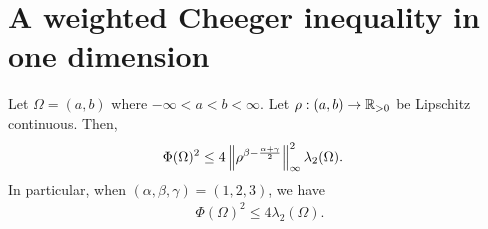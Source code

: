 
\section{A weighted Cheeger inequality in one dimension}
\label{sec:one_dim}
\begin{theorem}
\label{thm:cheeger_1}
Let $\Omega = (a,b)$ where $-\infty<a<b<\infty$. Let $\rho:(a,b)\to\mathbb{R}_{>0}$ be Lipschitz continuous. Then,
\begin{align*}
\Phi(\Omega)^{2} &\leq 4\left\lVert \rho^{\beta - \frac{\alpha+\gamma}{2}} \right\rVert^2_\infty\lambda_2(\Omega).
\end{align*}
In particular, when $(\alpha,\beta,\gamma) = (1,2,3)$, we have
\begin{align*}
\Phi(\Omega)^2\leq 4\lambda_2(\Omega).
\end{align*}
\end{theorem}
